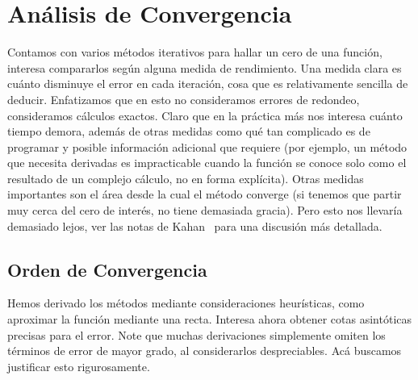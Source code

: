 

\chapter{Análisis de Convergencia}
\label{cha:convergencia}

  Contamos con varios métodos iterativos para hallar un cero de una función,
  interesa compararlos según alguna medida de rendimiento.
  Una medida clara es cuánto disminuye el error en cada iteración,
  cosa que es relativamente sencilla de deducir.
  Enfatizamos que en esto no consideramos errores de redondeo,
  consideramos cálculos exactos.
  Claro que en la práctica más nos interesa cuánto tiempo demora,
  además de otras medidas como qué tan complicado es de programar
  y posible información adicional que requiere
  (por ejemplo,
   un método que necesita derivadas es impracticable
   cuando la función se conoce solo
   como el resultado de un complejo cálculo,
   no en forma explícita).
  Otras medidas importantes son el área desde la cual el método converge
  (si tenemos que partir muy cerca del cero de interés,
   no tiene demasiada gracia).
  Pero esto nos llevaría demasiado lejos,
  ver las notas de Kahan~%
    \cite{kahan16:_lecture_notes_real_root_finding}
  para una discusión más detallada.

\section{Orden de Convergencia}

  Hemos derivado los métodos mediante consideraciones heurísticas,
  como aproximar la función mediante una recta.
  Interesa ahora obtener cotas asintóticas precisas para el error.
  Note que muchas derivaciones simplemente
  omiten los términos de error de mayor grado,
  al considerarlos despreciables.
  Acá buscamos justificar esto rigurosamente.

